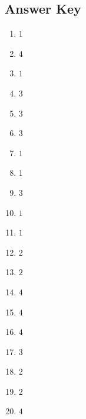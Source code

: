 \documentclass{article}
\begin{document}
\newpage

\subsection*{Answer Key}

\begin{enumerate}
\item $\displaystyle 1 $ \ 
\item $\displaystyle 4 $ \ 
\item $\displaystyle 1 $ \ 
\item $\displaystyle 3 $ \ 
\item $\displaystyle 3 $ \ 
\item $\displaystyle 3 $ \ 
\item $\displaystyle 1 $ \ 
\item $\displaystyle 1 $ \ 
\item $\displaystyle 3 $ \ 
\item $\displaystyle 1 $ \ 
\item $\displaystyle 1 $ \ 
\item $\displaystyle 2 $ \ 
\item $\displaystyle 2 $ \ 
\item $\displaystyle 4 $ \ 
\item $\displaystyle 4 $ \ 
\item $\displaystyle 4 $ \ 
\item $\displaystyle 3 $ \ 
\item $\displaystyle 2 $ \ 
\item $\displaystyle 2 $ \ 
\item $\displaystyle 4 $ \ 

\end{enumerate}
\end{document}
